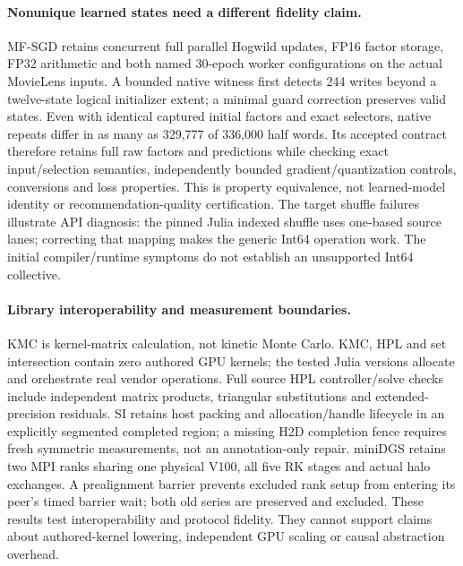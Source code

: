 \paragraph{Nonunique learned states need a different fidelity claim.}
MF-SGD retains concurrent full parallel Hogwild updates, FP16 factor storage, FP32 arithmetic and both named 30-epoch worker configurations on the actual MovieLens inputs. A bounded native witness first detects 244 writes beyond a twelve-state logical initializer extent; a minimal guard correction preserves valid states. Even with identical captured initial factors and exact selectors, native repeats differ in as many as 329,777 of 336,000 half words. Its accepted contract therefore retains full raw factors and predictions while checking exact input/selection semantics, independently bounded gradient/quantization controls, conversions and loss properties. This is property equivalence, not learned-model identity or recommendation-quality certification. The target shuffle failures illustrate API diagnosis: the pinned Julia indexed shuffle uses one-based source lanes; correcting that mapping makes the generic Int64 operation work. The initial compiler/runtime symptoms do not establish an unsupported Int64 collective.

\paragraph{Library interoperability and measurement boundaries.}
KMC is kernel-matrix calculation, not kinetic Monte Carlo. KMC, HPL and set intersection contain zero authored GPU kernels; the tested Julia versions allocate and orchestrate real vendor operations. Full source HPL controller/solve checks include independent matrix products, triangular substitutions and extended-precision residuals. SI retains host packing and allocation/handle lifecycle in an explicitly segmented completed region; a missing H2D completion fence requires fresh symmetric measurements, not an annotation-only repair. miniDGS retains two MPI ranks sharing one physical V100, all five RK stages and actual halo exchanges. A prealignment barrier prevents excluded rank setup from entering its peer's timed barrier wait; both old series are preserved and excluded. These results test interoperability and protocol fidelity. They cannot support claims about authored-kernel lowering, independent GPU scaling or causal abstraction overhead.


